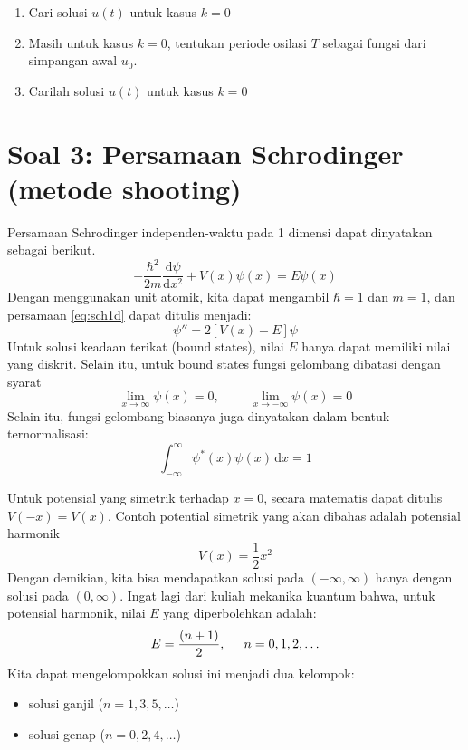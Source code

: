 \documentclass[12pt]{article}
\begin{document}
\begin{enumerate}[label=(\alph*)]
\item Cari solusi $u(t)$ untuk kasus $k=0$
\item Masih untuk kasus $k=0$, tentukan periode osilasi $T$ sebagai
fungsi dari simpangan awal $u_0$.
\item Carilah solusi $u(t)$ untuk kasus $k=0$
\end{enumerate}


\section{Soal 3: Persamaan Schrodinger (metode shooting)}

Persamaan Schrodinger independen-waktu pada 1 dimensi
dapat dinyatakan sebagai berikut.
\begin{equation}
-\frac{\hbar^2}{2m}\frac{\mathrm{d}\psi}{\mathrm{d}x^2}
+ V(x)\psi(x) = E\psi(x)
\label{eq:sch1d}
\end{equation}
Dengan menggunakan unit atomik, kita dapat mengambil $\hbar = 1$
dan $m = 1$, dan persamaan \eqref{eq:sch1d} dapat ditulis menjadi:
\begin{equation}
\psi'' = 2\left[ V(x) - E \right]\psi
\label{eq:sch1d_2}
\end{equation}
Untuk solusi keadaan terikat (bound states), nilai $E$ hanya dapat memiliki
nilai yang diskrit. Selain itu, untuk bound states
fungsi gelombang dibatasi dengan syarat
\begin{equation}
\lim_{x\rightarrow\infty} \psi(x) = 0,\hspace{1cm}\lim_{x\rightarrow-\infty} \psi(x) = 0
\end{equation}
Selain itu, fungsi gelombang biasanya juga dinyatakan dalam bentuk ternormalisasi:
\begin{equation}
\int_{-\infty}^{\infty} \psi^{*}(x) \psi(x)\,\mathrm{d}x = 1
\end{equation}

Untuk potensial yang simetrik terhadap $x=0$, secara matematis dapat ditulis
$V(-x) = V(x)$. Contoh potential simetrik yang akan dibahas adalah potensial harmonik
\begin{equation}
V(x) = \frac{1}{2}x^2
\end{equation}
Dengan demikian, kita bisa mendapatkan solusi pada $(-\infty,\infty)$ hanya dengan
solusi pada $(0,\infty)$.
Ingat lagi dari kuliah mekanika kuantum bahwa,
untuk potensial harmonik, nilai $E$ yang diperbolehkan adalah:
\begin{equation}
E = \frac{(n + 1)}{2}, \hspace{0.5cm} n = 0,1,2,\ldots
\end{equation}
Kita dapat mengelompokkan solusi ini menjadi dua kelompok:
\begin{itemize}
\item solusi ganjil ($n = 1, 3, 5, \ldots$)
\item solusi genap ($n = 0, 2, 4, \ldots$)
\end{itemize}
\end{document}
